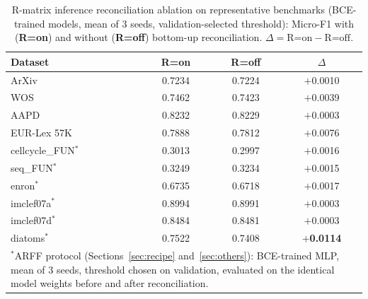 \documentclass[preprint,12pt]{elsarticle}
\begin{document}
\begin{table}[htbp]
\centering
\caption{R-matrix inference reconciliation ablation on representative
benchmarks (BCE-trained models, mean of 3 seeds, validation-selected
threshold): Micro-F1 with (\textbf{R=on}) and without (\textbf{R=off})
bottom-up reconciliation. $\Delta = \text{R=on} - \text{R=off}$.}
\label{tab:ablation}
\begin{tabular}{lccc}
\toprule
\textbf{Dataset} & \textbf{R=on} & \textbf{R=off} & $\Delta$ \\
\midrule
ArXiv   & 0.7234 & 0.7224 & $+$0.0010 \\
WOS     & 0.7462 & 0.7423 & $+$0.0039 \\
AAPD    & 0.8232 & 0.8229 & $+$0.0003 \\
EUR-Lex 57K & 0.7888 & 0.7812 & $+$0.0076 \\
\midrule
cellcycle\_FUN$^\ast$ & 0.3013 & 0.2997 & $+$0.0016 \\
seq\_FUN$^\ast$       & 0.3249 & 0.3234 & $+$0.0015 \\
enron$^\ast$          & 0.6735 & 0.6718 & $+$0.0017 \\
imclef07a$^\ast$      & 0.8994 & 0.8991 & $+$0.0003 \\
imclef07d$^\ast$      & 0.8484 & 0.8481 & $+$0.0003 \\
diatoms$^\ast$        & 0.7522 & 0.7408 & \textbf{$+$0.0114} \\
\bottomrule
\multicolumn{4}{p{0.68\textwidth}}{\small $^\ast$ARFF protocol (Sections~\ref{sec:recipe} and~\ref{sec:others}): BCE-trained MLP, mean of 3 seeds, threshold chosen on validation, evaluated on the identical model weights before and after reconciliation.} \\
\end{tabular}
\end{table}
\end{document}
